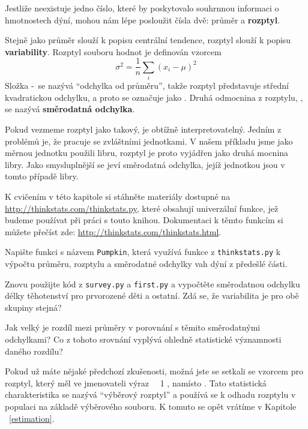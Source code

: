 \documentclass[12pt]{book}
\begin{document}
Jestliže neexistuje jedno číslo, které by poskytovalo souhrnnou informaci o hmotnostech dýní, mohou nám lépe posloužit čísla dvě: průměr a {\bf rozptyl}.

Stejně jako průměr slouží k popisu centrální tendence, rozptyl slouží k popisu {\bf variability}.
Rozptyl souboru hodnot je definován vzorcem
%
\[ \sigma^2 = \frac{1}{n} \sum_i (x_i - \mu)^2 \]
%
Složka \xsubi-\mymu~se nazývá ``odchylka od průměru'', takže
rozptyl představuje střední kvadratickou odchylku, a proto se označuje jako
\sigmasq.  Druhá odmocnina z rozptylu, \mysigma, se nazývá {\bf
  směrodatná odchylka}.

Pokud vezmeme rozptyl jako takový, je obtížně interpretovatelný.  Jedním z problémů je, že pracuje se zvláštními jednotkami. V našem příkladu jsme jako měrnou jednotku použili libru, rozptyl je proto vyjádřen jako druhá mocnina libry. Jako smysluplnější se jeví směrodatná odchylka, jejíž jednotkou jsou v tomto případě libry.

\begin{exercise}
K cvičením v této kapitole si stáhněte materiály dostupné na
\url{http://thinkstats.com/thinkstats.py}, které obsahují univerzální funkce, jež budeme používat při práci s touto knihou.  Dokumentaci k těmto funkcím si můžete přečíst zde:
\url{http://thinkstats.com/thinkstats.html}.

Napište funkci s názvem
{\tt Pumpkin}, která využívá funkce z {\tt thinkstats.py} k výpočtu průměru, rozptylu a směrodatné odchylky vah dýní z předešlé části.

\end{exercise}

\begin{exercise}
Znovu použijte kód z {\tt survey.py} a {\tt first.py} a vypočtěte směrodatnou odchylku délky těhotenství pro prvorozené děti a ostatní. Zdá se, že variabilita je pro obě skupiny stejná?

Jak velký je rozdíl mezi průměry v porovnání s těmito směrodatnými odchylkami? Co z tohoto srovnání vyplývá ohledně statistické významnosti daného rozdílu?
\end{exercise}

Pokud už máte nějaké předchozí zkušenosti, možná jste se setkali se vzorcem pro rozptyl, který měl ve jmenovateli výraz \n~\minus~1 , namísto \n.  Tato statistická charakteristika se nazývá ``výběrový rozptyl'' a používá se k odhadu rozptylu v populaci na základě výběrového souboru.
K tomuto se opět vrátíme v Kapitole ~\ref{estimation}.  
\end{document}
